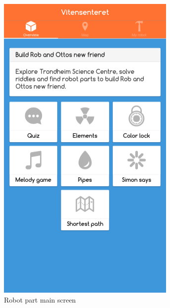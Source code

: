 \begin{figure}[H]
\begin{minipage}[b]{0.35\textwidth}
    \includegraphics[width=\textwidth]{images/app/overview.png}
    \caption{Robot part main screen}
  \end{minipage}
  \begin{minipage}[b]{0.35\textwidth}

\end{minipage}
\end{figure}

